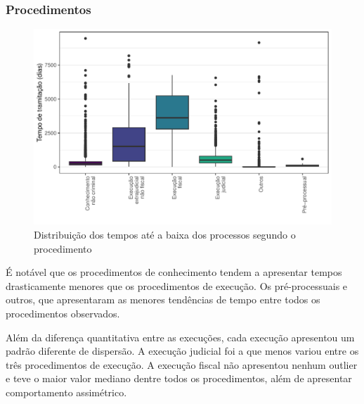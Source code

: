 \subsubsection{Procedimentos}
\begin{figure}[H]
    \centering
    \caption{Distribuição dos tempos até a baixa dos processos segundo o procedimento}
    \label{fig:procedimentos_tempo}
    \includegraphics[scale=.9]{imagens/procedimento_tempo.pdf}
\end{figure}

É notável que os procedimentos de conhecimento tendem a apresentar tempos drasticamente menores que os procedimentos de execução. Os pré-processuais e outros, que apresentaram as menores tendências de tempo entre todos os procedimentos observados.

Além da diferença quantitativa entre as execuções, cada execução apresentou um padrão diferente de dispersão. A execução judicial foi a que menos variou entre os três procedimentos de execução. A execução fiscal não apresentou nenhum outlier e teve o maior valor mediano dentre todos os procedimentos, além de apresentar comportamento assimétrico.

